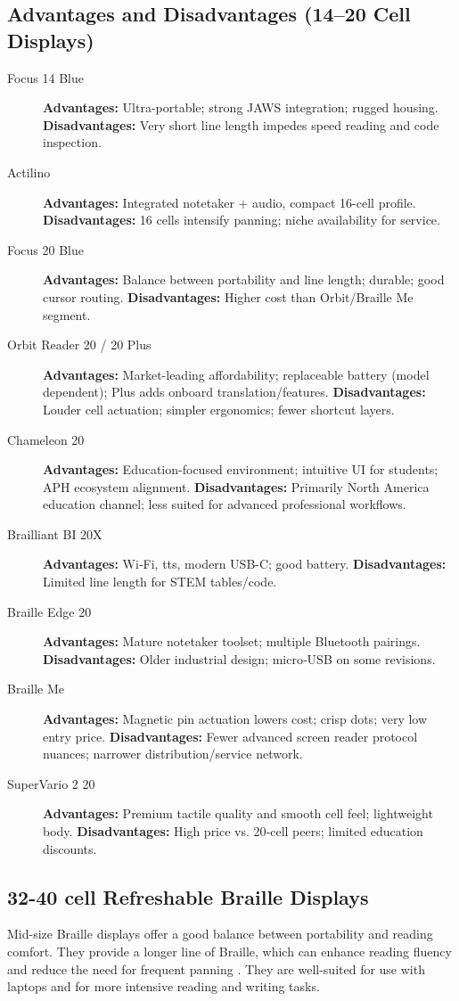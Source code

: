 \subsection*{Advantages and Disadvantages (14--20 Cell Displays)}
\begin{description}
	\item[Focus 14 Blue] \textbf{Advantages:} Ultra-portable; strong JAWS integration; rugged housing. \textbf{Disadvantages:} Very short line length impedes speed reading and code inspection.
	\item[Actilino] \textbf{Advantages:} Integrated notetaker + audio, compact 16-cell  profile. \textbf{Disadvantages:} 16 cells intensify panning; niche availability for service.
	\item[Focus 20 Blue] \textbf{Advantages:} Balance between portability and line length; durable; good cursor routing. \textbf{Disadvantages:} Higher cost than Orbit/Braille Me segment.
	\item[Orbit Reader 20 / 20 Plus] \textbf{Advantages:} Market-leading affordability; replaceable battery (model dependent); Plus adds onboard translation/features. \textbf{Disadvantages:} Louder cell actuation; simpler ergonomics; fewer shortcut layers.
	\item[Chameleon 20] \textbf{Advantages:} Education-focused environment; intuitive UI for students; APH ecosystem alignment. \textbf{Disadvantages:} Primarily North America education channel; less suited for advanced professional workflows.
	\item[Brailliant BI 20X] \textbf{Advantages:} Wi‑Fi, \gls{tts}, modern USB-C; good battery. \textbf{Disadvantages:} Limited line length for STEM tables/code.
	\item[Braille Edge 20] \textbf{Advantages:} Mature notetaker toolset; multiple Bluetooth pairings. \textbf{Disadvantages:} Older industrial design; micro‑USB on some revisions.
	\item[Braille Me] \textbf{Advantages:} Magnetic pin actuation lowers cost; crisp dots; very low entry price. \textbf{Disadvantages:} Fewer advanced screen reader protocol nuances; narrower distribution/service network.
	\item[SuperVario 2 20] \textbf{Advantages:} Premium tactile quality and smooth cell feel; lightweight body. \textbf{Disadvantages:} High price vs. 20‑cell peers; limited education discounts.
\end{description}


\subsection{32-40 cell Refreshable Braille Displays}\label{ch3:ssec:32-40-cell}
Mid-size Braille displays offer a good balance between portability and reading comfort. They provide a longer line of Braille, which can enhance reading fluency and reduce the need for frequent panning \supercite{Wall2003, Holbrook2006, Kamei-Hannan2012}. They are well-suited for use with laptops and for more intensive reading and writing tasks.

